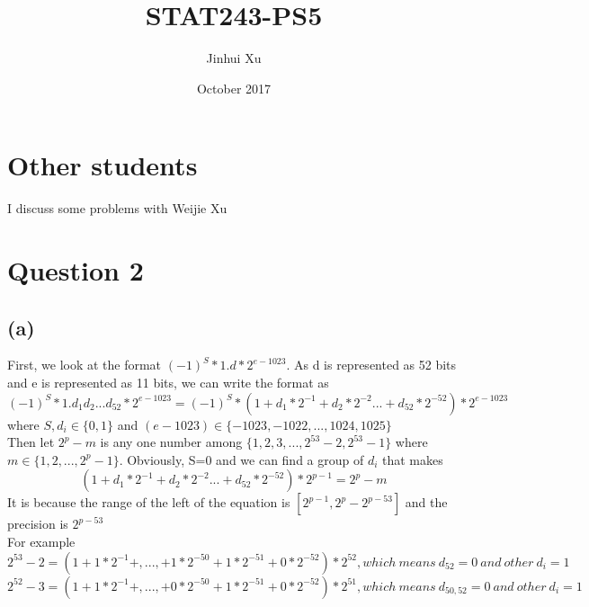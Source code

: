 \documentclass{article}\usepackage[]{graphicx}\usepackage[]{color}
\begin{document}
 
\title{STAT243-PS5}
\author{Jinhui Xu}
\date{October 2017}

\maketitle

\section{Other students}
I discuss some problems with Weijie Xu
\section{Question 2}

\subsection{(a)}
First, we look at the format $(-1)^S*1.d*2^{e-1023}$. 
As d is represented as 52 bits and e is represented as 11 bits, we can write the format as  $$(-1)^S*1.d_{1}d_{2}...d_{52}*2^{e-1023}=(-1)^S*(1+d_{1}*2^{-1}+d_{2}*2^{-2}...+d_{52}*2^{-52})*2^{e-1023}$$ where $S,d_{i} \in \{0,1\}$ and $(e-1023) \in \{-1023,-1022,...,1024,1025\}$\\

Then let $2^p-m$ is any one number among $\{1,2,3,...,2^{53}-2,2^{53}-1\}$ where $m \in \{1,2,...,2^p-1\}$. Obviously, S=0 and we can find a group of $d_{i}$ that makes $$(1+d_{1}*2^{-1}+d_{2}*2^{-2}...+d_{52}*2^{-52})*2^{p-1}=2^p-m$$ It is because the range of the left of the equation is $[2^{p-1},2^{p}-2^{p-53}]$ and the precision is $2^{p-53}$\\

For example\\
$$2^{53}-2=(1+1*2^{-1}+,...,+1*2^{-50}+1*2^{-51}+0*2^{-52})*2^{52},which\ means\ d_{52}=0\ and\ other\ d_{i}=1$$
$$2^{52}-3=(1+1*2^{-1}+,...,+0*2^{-50}+1*2^{-51}+0*2^{-52})*2^{51},which\ means\ d_{50,52}=0\ and\ other\ d_{i}=1$$
\end{document}
